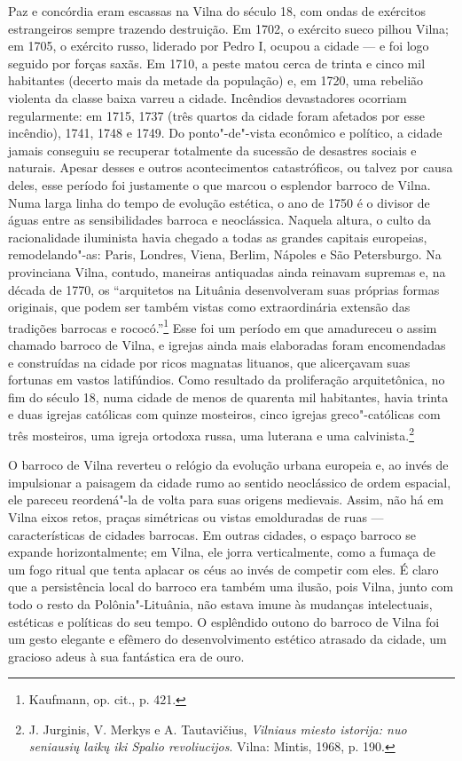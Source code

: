 Paz e concórdia eram escassas na Vilna do século 18, com ondas de
exércitos estrangeiros sempre trazendo destruição. Em 1702, o exército
sueco pilhou Vilna; em 1705, o exército russo, liderado por Pedro I,
ocupou a cidade --- e foi logo seguido por forças saxãs. Em 1710, a peste
matou cerca de trinta e cinco mil habitantes (decerto mais da metade da
população) e, em 1720, uma rebelião violenta da classe baixa varreu a
cidade. Incêndios devastadores ocorriam regularmente: em 1715, 1737
(três quartos da cidade foram afetados por esse incêndio), 1741, 1748 e
1749. Do ponto"-de"-vista econômico e político, a cidade jamais conseguiu
se recuperar totalmente da sucessão de desastres sociais e naturais.
Apesar desses e outros acontecimentos catastróficos, ou talvez por causa
deles, esse período foi justamente o que marcou o esplendor barroco de
Vilna. Numa larga linha do tempo de evolução estética, o ano de 1750 é o
divisor de águas entre as sensibilidades barroca e neoclássica. Naquela
altura, o culto da racionalidade iluminista havia chegado a todas as
grandes capitais europeias, remodelando"-as: Paris, Londres, Viena,
Berlim, Nápoles e São Petersburgo. Na provinciana Vilna, contudo,
maneiras antiquadas ainda reinavam supremas e, na década de 1770, os
``arquitetos na Lituânia desenvolveram suas próprias formas originais,
que podem ser também vistas como extraordinária extensão das tradições
barrocas e rococó.''\footnote{Kaufmann, op. cit., p. 421.} Esse foi um
período em que amadureceu o assim chamado barroco de Vilna, e igrejas
ainda mais elaboradas foram encomendadas e construídas na cidade por
ricos magnatas lituanos, que alicerçavam suas fortunas em vastos
latifúndios. Como resultado da proliferação arquitetônica, no fim do
século 18, numa cidade de menos de quarenta mil habitantes, havia trinta
e duas igrejas católicas com quinze mosteiros, cinco igrejas
greco"-católicas com três mosteiros, uma igreja ortodoxa russa, uma
luterana e uma calvinista.\footnote{J. Jurginis, V. Merkys e A. Tautavičius, \textit{Vilniaus miesto istorija: nuo seniausių laikų iki Spalio revoliucijos}. Vilna: Mintis, 1968, p. 190.}
%

O barroco de Vilna reverteu o relógio da evolução urbana europeia e, ao
invés de impulsionar a paisagem da cidade rumo ao sentido neoclássico de
ordem espacial, ele pareceu reordená"-la de volta para suas origens
medievais. Assim, não há em Vilna eixos retos, praças simétricas ou
vistas emolduradas de ruas --- características de cidades barrocas. Em
outras cidades, o espaço barroco se expande horizontalmente; em Vilna,
ele jorra verticalmente, como a fumaça de um fogo ritual que tenta
aplacar os céus ao invés de competir com eles. É claro que a
persistência local do barroco era também uma ilusão, pois Vilna, junto
com todo o resto da Polônia"-Lituânia, não estava imune às mudanças
intelectuais, estéticas e políticas do seu tempo. O esplêndido outono do
barroco de Vilna foi um gesto elegante e efêmero do desenvolvimento
estético atrasado da cidade, um gracioso adeus à sua fantástica era de
ouro.

